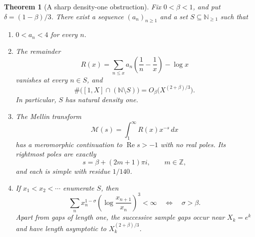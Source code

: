 \documentclass[11pt,a4paper]{article}
\newtheorem{theorem}{Theorem}[section]
\theoremstyle{definition}
\theoremstyle{remark}
\numberwithin{equation}{section}
\begin{document}
\begin{theorem}[A sharp density-one obstruction]
\label{thm:density-one-obstruction}
Fix $0<\beta<1$, and put $\delta=(1-\beta)/3$. There exist a sequence
$(a_n)_{n\geq1}$ and a set $S\subseteq\mathbb N_{\geq1}$ such that
\begin{enumerate}
\item $0<a_n<4$ for every $n$.
\item The remainder
\[
 R(x)=\sum_{n\leq x}a_n\left(\frac1n-\frac1x\right)-\log x
\]
vanishes at every $n\in S$, and
\[
 \#\bigl([1,X]\cap(\mathbb N\setminus S)\bigr)
       =O_\beta\bigl(X^{(2+\beta)/3}\bigr).
\]
In particular, $S$ has natural density one.
\item The Mellin transform
\[
 \mathcal M(s)=\int_1^\infty R(x)x^{-s}\,dx
\]
has a meromorphic continuation to $\operatorname{Re}s>-1$ with no real
poles. Its rightmost poles are exactly
\[
 s=\beta+(2m+1)\pi i,\qquad m\in\mathbb Z,
\]
and each is simple with residue $1/140$.
\item If $x_1<x_2<\cdots$ enumerate $S$, then
\[
 \sum_n x_n^{1-\sigma}
       \left(\log\frac{x_{n+1}}{x_n}\right)^3<\infty
       \quad\Longleftrightarrow\quad \sigma>\beta.
\]
Apart from gaps of length one, the successive sample gaps occur near
$X_k=e^k$ and have length asymptotic to $X_k^{(2+\beta)/3}$.
\end{enumerate}
\end{theorem}
\end{document}
